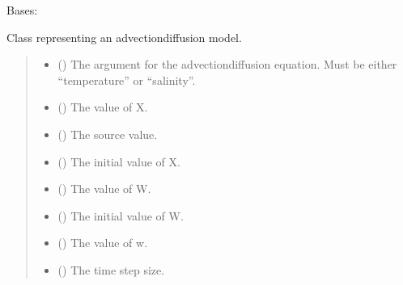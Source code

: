 \documentclass[a4paper,11pt,english,openany]{sphinxmanual}
\begin{document}
\begin{fulllineitems}
\label{\detokenize{api/spyice.models.advection_diffusion:spyice.models.advection_diffusion.AdvectionDiffusion}}
\pysigstartsignatures
{}
\pysigstopsignatures
\sphinxAtStartPar
Bases: 

\sphinxAtStartPar
Class representing an advection\sphinxhyphen{}diffusion model.
\begin{quote}\begin{description}
\begin{itemize}
\item {} 
\sphinxAtStartPar
{} () \textendash{} The argument for the advection\sphinxhyphen{}diffusion equation. Must be either “temperature” or “salinity”.

\item {} 
\sphinxAtStartPar
{} () \textendash{} The value of X.

\item {} 
\sphinxAtStartPar
{} () \textendash{} The source value.

\item {} 
\sphinxAtStartPar
{} () \textendash{} The initial value of X.

\item {} 
\sphinxAtStartPar
{} () \textendash{} The value of W.

\item {} 
\sphinxAtStartPar
{} () \textendash{} The initial value of W.

\item {} 
\sphinxAtStartPar
{} () \textendash{} The value of w.

\item {} 
\sphinxAtStartPar
{} () \textendash{} The time step size.


\end{itemize}
\end{description}
\end{quote}
\end{fulllineitems}
\end{document}
